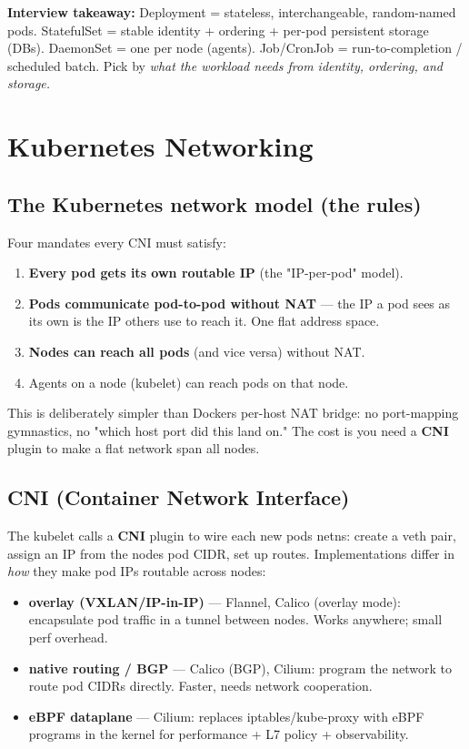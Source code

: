 \documentclass[11pt]{article}
\providecommand{\tightlist}{\setlength{\itemsep}{1pt}\setlength{\parskip}{0pt}}
\begin{document}
\textbf{Interview takeaway:} Deployment = stateless, interchangeable, random-named pods. StatefulSet = stable identity + ordering + per-pod persistent storage (DBs). DaemonSet = one per node (agents). Job/CronJob = run-to-completion / scheduled batch. Pick by \emph{what the workload needs from identity, ordering, and storage.}

\section{Kubernetes Networking}\label{kubernetes-networking}

\subsection{The Kubernetes network model (the rules)}\label{the-kubernetes-network-model-the-rules}

Four mandates every CNI must satisfy:

\begin{enumerate}
\def\labelenumi{\arabic{enumi}.}
\tightlist
\item
  \textbf{Every pod gets its own routable IP} (the "IP-per-pod" model).
\item
  \textbf{Pods communicate pod-to-pod without NAT} --- the IP a pod sees as its own is the IP others use to reach it. One flat address space.
\item
  \textbf{Nodes can reach all pods} (and vice versa) without NAT.
\item
  Agents on a node (kubelet) can reach pods on that node.
\end{enumerate}

This is deliberately simpler than Docker\textquotesingle s per-host NAT bridge: no port-mapping gymnastics, no "which host port did this land on." The cost is you need a \textbf{CNI} plugin to make a flat network span all nodes.

\subsection{CNI (Container Network Interface)}\label{cni-container-network-interface}

The kubelet calls a \textbf{CNI} plugin to wire each new pod\textquotesingle s netns: create a veth pair, assign an IP from the node\textquotesingle s pod CIDR, set up routes. Implementations differ in \emph{how} they make pod IPs routable across nodes:

\begin{itemize}
\tightlist
\item
  \textbf{overlay (VXLAN/IP-in-IP)} --- Flannel, Calico (overlay mode): encapsulate pod traffic in a tunnel between nodes. Works anywhere; small perf overhead.
\item
  \textbf{native routing / BGP} --- Calico (BGP), Cilium: program the network to route pod CIDRs directly. Faster, needs network cooperation.
\item
  \textbf{eBPF dataplane} --- Cilium: replaces iptables/kube-proxy with eBPF programs in the kernel for performance + L7 policy + observability.
\end{itemize}
\end{document}
